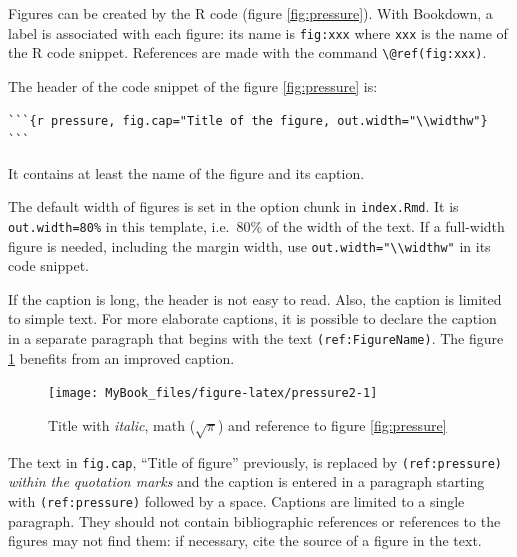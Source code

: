 \documentclass[
  12pt,
  american,
  a4paper,
  extrafontsizes,onecolumn,openright
  ]{memoir}
\newlength\widthw %
\begin{document}
\normalsize

Figures can be created by the R code (figure \ref{fig:pressure}).
With Bookdown, a label is associated with each figure: its name is \texttt{fig:xxx} where \texttt{xxx} is the name of the R code snippet.
References are made with the command \texttt{\textbackslash{}@ref(fig:xxx)}.

The header of the code snippet of the figure \ref{fig:pressure} is:

\begin{verbatim}
```{r pressure, fig.cap="Title of the figure, out.width="\\widthw"}
```
\end{verbatim}

It contains at least the name of the figure and its caption.

The default width of figures is set in the option chunk in \texttt{index.Rmd}.
It is \texttt{out.width=\textquotesingle{}80\%\textquotesingle{}} in this template, i.e.~80\% of the width of the text.
If a full-width figure is needed, including the margin width, use \texttt{out.width="\textbackslash{}\textbackslash{}widthw"} in its code snippet.

If the caption is long, the header is not easy to read.
Also, the caption is limited to simple text.
For more elaborate captions, it is possible to declare the caption in a separate paragraph that begins with the text \texttt{(ref:FigureName)}.
The figure \ref{fig:pressure2} benefits from an improved caption.



\scriptsize

\begin{figure}

{\centering \texttt{[image: MyBook\_files/figure-latex/pressure2-1]} 

}

\caption{Title with \emph{italic}, math (\(\sqrt\pi\)) and reference to figure \ref{fig:pressure}}\label{fig:pressure2}
\end{figure}

\normalsize

The text in \texttt{fig.cap}, ``Title of figure'' previously, is replaced by \texttt{(ref:pressure)} \emph{within the quotation marks} and the caption is entered in a paragraph starting with \texttt{(ref:pressure)} followed by a space.
Captions are limited to a single paragraph.
They should not contain bibliographic references or references to the figures may not find them: if necessary, cite the source of a figure in the text.
\end{document}
